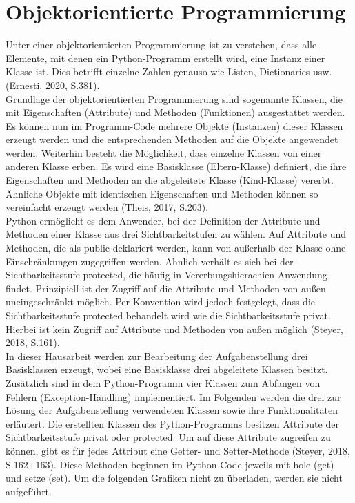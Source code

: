 \documentclass[11pt,a4paper]{scrreprt}
\begin{document}
\section{Objektorientierte Programmierung}
\label{sec:OOP}
Unter einer objektorientierten Programmierung ist zu verstehen, dass alle Elemente, mit denen ein Python-Programm erstellt wird, eine Instanz einer Klasse ist. Dies betrifft einzelne Zahlen genauso wie Listen, Dictionaries usw. (Ernesti, 2020, S.381). \\
Grundlage der objektorientierten Programmierung sind sogenannte Klassen, die mit Eigenschaften (Attribute) und Methoden (Funktionen) ausgestattet werden. Es können nun im Programm-Code mehrere Objekte (Instanzen) dieser Klassen erzeugt werden und die entsprechenden Methoden auf die Objekte angewendet werden. Weiterhin besteht die Möglichkeit, dass einzelne Klassen von einer anderen Klasse erben. Es wird eine Basisklasse (Eltern-Klasse) definiert, die ihre Eigenschaften und Methoden an die abgeleitete Klasse (Kind-Klasse) vererbt. Ähnliche Objekte mit identischen Eigenschaften und Methoden können so vereinfacht erzeugt werden (Theis, 2017, S.203).\\
Python ermöglicht es dem Anwender, bei der Definition der Attribute und Methoden einer Klasse aus drei Sichtbarkeitstufen zu wählen. Auf Attribute und Methoden, die als public deklariert werden, kann von außerhalb der Klasse ohne Einschränkungen zugegriffen werden. Ähnlich verhält es sich bei der Sichtbarkeitsstufe protected, die häufig in Vererbungshierachien Anwendung findet. Prinzipiell ist der Zugriff auf die Attribute und Methoden von außen uneingeschränkt möglich. Per Konvention wird jedoch festgelegt, dass die Sichtbarkeitsstufe protected behandelt wird wie die Sichtbarkeitsstufe privat. Hierbei ist kein Zugriff auf Attribute und Methoden von außen möglich (Steyer, 2018, S.161).\\
In dieser Hausarbeit werden zur Bearbeitung der Aufgabenstellung drei Basisklassen erzeugt, wobei eine Basisklasse drei abgeleitete Klassen besitzt. Zusätzlich sind in dem Python-Programm vier Klassen zum Abfangen von Fehlern (Exception-Handling) implementiert. Im Folgenden werden die drei zur Lösung der Aufgabenstellung verwendeten Klassen sowie ihre Funktionalitäten erläutert. 
Die erstellten Klassen des Python-Programms besitzen Attribute der Sichtbarkeitsstufe privat oder protected. Um auf diese Attribute zugreifen zu können, gibt es für jedes Attribut eine Getter- und Setter-Methode (Steyer, 2018, S.162+163). Diese Methoden beginnen im Python-Code jeweils mit hole (get) und setze (set). Um die folgenden Grafiken nicht zu überladen, werden sie nicht aufgeführt.  
\end{document}
